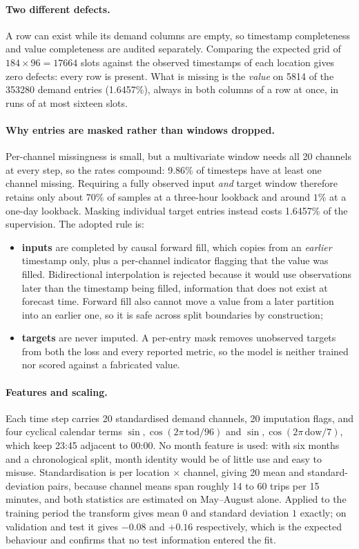 \documentclass[11pt,a4paper]{article}
\begin{document}
\paragraph{Two different defects.} A row can exist while its demand columns are
empty, so timestamp completeness and value completeness are audited separately.
Comparing the expected grid of $184\times96=
17664$ slots against the observed timestamps of each
location gives zero defects: every row is present. What is missing is the
\emph{value} on 5814 of the
353280 demand entries
(1.6457\%), always in both columns of a row at once, in
runs of at most sixteen slots.

\paragraph{Why entries are masked rather than windows dropped.} Per-channel
missingness is small, but a multivariate window needs all 20 channels at every step,
so the rates compound: 9.86\% of
timesteps have at least one channel missing. Requiring a fully observed input
\emph{and} target window therefore retains only about $70\%$ of samples at a
three-hour lookback and around $1\%$ at a one-day lookback. Masking individual
target entries instead costs 1.6457\% of the supervision.
The adopted rule is:
\begin{itemize}[nosep]
  \item \textbf{inputs} are completed by causal forward fill, which copies from an
    \emph{earlier} timestamp only, plus a per-channel indicator flagging that the
    value was filled. Bidirectional interpolation is rejected because it would use
    observations later than the timestamp being filled, information that does not
    exist at forecast time. Forward fill also cannot move a value from a later
    partition into an earlier one, so it is safe across split boundaries by
    construction;
  \item \textbf{targets} are never imputed. A per-entry mask removes unobserved
    targets from both the loss and every reported metric, so the model is neither
    trained nor scored against a fabricated value.
\end{itemize}

\paragraph{Features and scaling.} Each time step carries 20 standardised demand
channels, 20 imputation flags, and four cyclical calendar terms
$\sin,\cos(2\pi\,\text{tod}/96)$ and $\sin,\cos(2\pi\,\text{dow}/7)$, which keep
23:45 adjacent to 00:00. No month feature is used: with six months and a
chronological split, month identity would be of little use and easy to misuse.
Standardisation is per location $\times$ channel, giving 20 mean and
standard-deviation pairs, because channel means span roughly 14 to 60 trips per 15
minutes, and both
statistics are estimated on May--August alone. Applied to the training period the
transform gives mean $0$ and standard deviation $1$ exactly; on validation and test
it gives $-0.08$ and $+0.16$ respectively, which is the expected behaviour and
confirms that no test information entered the fit.
\end{document}
